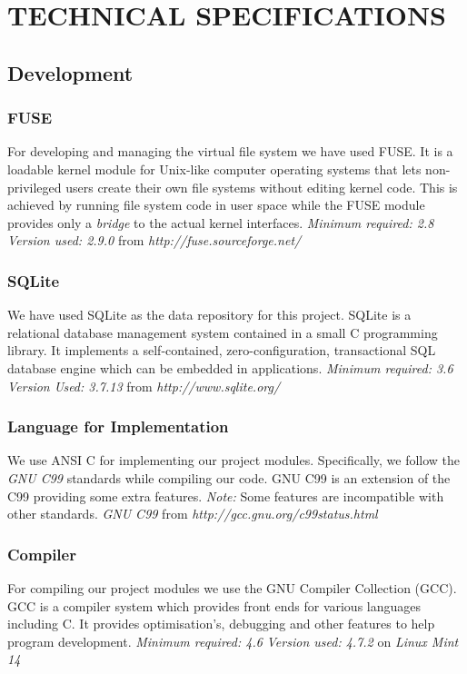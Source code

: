 \chapter {TECHNICAL SPECIFICATIONS}
\section {Development}
\subsection {FUSE}
For developing and managing the virtual file system we have used FUSE. It is a loadable kernel module for Unix-like computer operating systems that lets non-privileged users create their own file systems without editing kernel code. This is achieved by running file system code in user space while the FUSE module provides only a \textit{bridge} to the actual kernel interfaces. \newline
\emph{Minimum required: 2.8} \newline
\emph{Version used: 2.9.0} from \emph{http://fuse.sourceforge.net/}

\subsection {SQLite}
We have used SQLite as the data repository for this project. SQLite is a relational database management system contained in a small C programming library. It implements a self-contained, zero-configuration, transactional SQL database engine which can be embedded in applications. \newline
\emph{Minimum required: 3.6} \newline
\emph{Version Used: 3.7.13} from \emph{http://www.sqlite.org/}

\subsection {Language for Implementation}
We use ANSI C for implementing our project modules. Specifically, we follow the \textit{GNU C99} standards while compiling our code. GNU C99 is an extension of the C99 providing some extra features. \emph{Note:} Some features are incompatible with other standards. \newline
\emph{GNU C99} from \emph{http://gcc.gnu.org/c99status.html}

\subsection {Compiler}
For compiling our project modules we use the GNU Compiler Collection (GCC). GCC is a compiler system which provides front ends for various languages including C. It provides optimisation's, debugging and other features to help program development. \newline
\emph{Minimum required: 4.6} \newline
\emph{Version used: 4.7.2} on \emph{Linux Mint 14}

